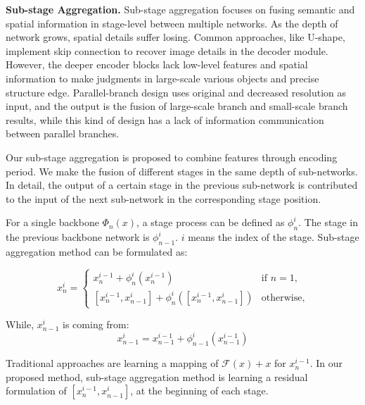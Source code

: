 \documentclass[10pt,twocolumn,letterpaper]{article}
\begin{document}
\textbf{Sub-stage Aggregation.} Sub-stage aggregation focuses on fusing semantic and spatial information in stage-level between multiple networks. As the depth of network grows, spatial details suffer losing. Common approaches, like U-shape, implement skip connection to recover image details in the decoder module. However, the deeper  encoder blocks lack low-level features and spatial information to make judgments in large-scale various objects and precise structure edge. Parallel-branch design uses original and decreased resolution as input, and the output is the fusion of large-scale branch and small-scale branch results, while this kind of design has a lack of information communication between parallel branches.

Our sub-stage aggregation is proposed to combine features through encoding period. We make the fusion of different stages in the same depth of sub-networks.
In detail, the output of a certain stage in the previous sub-network is contributed to the input of the next sub-network in the corresponding stage position.


For a single backbone $\Phi_n(x)$, a stage process can be defined as $\phi_{n}^{i}$. The stage in the previous backbone network is $\phi_{n-1}^{i}$. \text{ }$i$ means the index of the stage. Sub-stage aggregation method can be formulated as:







\begin{equation}
x_{n}^i=\left\{\begin{array}{ll}

x_{n}^{i-1} + \phi_{n}^{i}(x_{n}^{i-1})& {\text{if } n = 1},\\ 
{[x_{n}^{i-1},x_{n-1}^{i}] + \phi_{n}^{i}([x_{n}^{i-1},x_{n-1}^{i}])}& {\text{otherwise,}}

\end{array}\right.
\label{equ:sub-stage}
\end{equation}

While, $x_{n-1}^i$ is coming from:
\begin{equation}
x_{n-1}^{i} = x_{n-1}^{i-1} + \phi_{n - 1}^{i}(x_{n-1}^{i-1})
\end{equation}

Traditional approaches are learning a mapping of $\mathcal{F}(x) + x$ for $x_{n}^{i-1}$. In our proposed method, sub-stage aggregation method is learning a residual formulation of ${[x_{n}^{i-1},x_{n-1}^{i}]}$, at the beginning of each stage.
\end{document}
